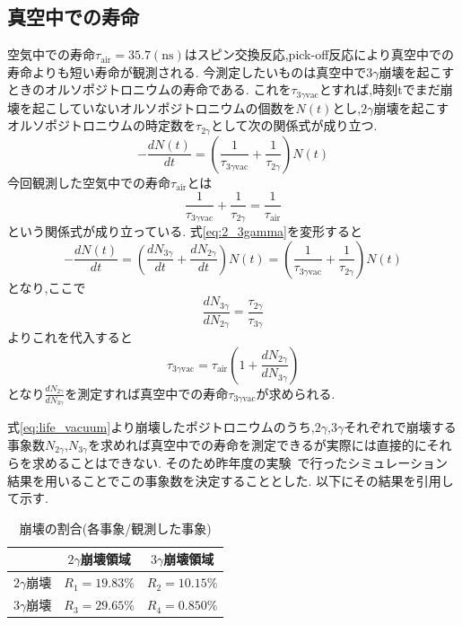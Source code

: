 \subsection{真空中での寿命}
空気中での寿命$\tau_\textrm{air}=35.7(\textrm{ns})$はスピン交換反応,pick-off反応により真空中での寿命よりも短い寿命が観測される.
今測定したいものは真空中で$3\gamma$崩壊を起こすときのオルソポジトロニウムの寿命である.
これを$\tau_{3\gamma\textrm{vac}}$とすれば,時刻tでまだ崩壊を起こしていないオルソポジトロニウムの個数を$N(t)$とし,$2\gamma$崩壊を起こすオルソポジトロニウムの時定数を$\tau_{2\gamma}$として次の関係式が成り立つ.
\begin{equation}
	-\frac{dN(t)}{dt}=\left(\frac{1}{\tau_{3\gamma\textrm{vac}}}+\frac{1}{\tau_{2\gamma}}\right)N(t)
	\label{eq:2_3gamma}
\end{equation}
今回観測した空気中での寿命$\tau_\textrm{air}$とは
\begin{equation}
	\nonumber
	\frac{1}{\tau_{3\gamma\textrm{vac}}}+\frac{1}{\tau_{2\gamma}}=\frac{1}{\tau_\textrm{air}}
\end{equation}
という関係式が成り立っている.
式\ref{eq:2_3gamma}を変形すると
\begin{equation}
	\nonumber
	-\frac{dN(t)}{dt}=\left(\frac{dN_{3\gamma}}{dt}+\frac{dN_{2\gamma}}{dt}\right)N(t)=\left(\frac{1}{\tau_{3\gamma\textrm{vac}}}+\frac{1}{\tau_{2\gamma}}\right)N(t)
\end{equation}
となり,ここで
\begin{equation}
	\nonumber
	\frac{dN_{3\gamma}}{dN_{2\gamma}}=\frac{\tau_{2\gamma}}{\tau_{3\gamma}}
\end{equation}
よりこれを代入すると
\begin{equation}
	\tau_{3\gamma\textrm{vac}}=\tau_\textrm{air}\left(1+\frac{dN_{2\gamma}}{dN_{3\gamma}}\right)
	\label{eq:life_vacuum}
\end{equation}
となり$\frac{dN_{2\gamma}}{dN_{3\gamma}}$を測定すれば真空中での寿命$\tau_{3\gamma \textrm{vac}}$が求められる.

式\ref{eq:life_vacuum}より崩壊したポジトロニウムのうち,$2\gamma$,$3\gamma$それぞれで崩壊する事象数$N_{2\gamma}$,$N_{3\gamma}$を求めれば真空中での寿命を測定できるが実際には直接的にそれらを求めることはできない.
そのため昨年度の実験~\cite{卒業論文2015}で行ったシミュレーション結果を用いることでこの事象数を決定することとした.
以下にその結果を引用して示す.
\begin{table}[htbp]
	\centering
		\begin{tabular}{|l|c|c|} \hline
			& $2\gamma$崩壊領域 & $3\gamma$崩壊領域 \\ \hline
			$2\gamma$崩壊 & $R_1=19.83\%$ & $R_2=10.15\%$\\
			$3\gamma$崩壊 & $R_3=29.65\%$ & $R_4=0.850\%$\\ \hline
		\end{tabular}
		\caption{崩壊の割合(各事象/観測した事象)}
		\label{2_3gamma_ratio}
\end{table}

